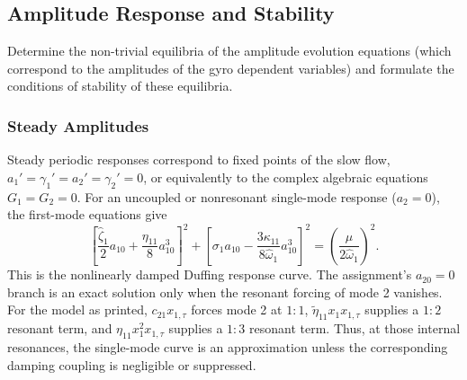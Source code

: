 \documentclass[11pt]{article}
\newenvironment{assignmentinstruction}{\par\begingroup\color{blue}}{\par\endgroup}
\begin{document}
\subsection{Amplitude Response and Stability}
\begin{assignmentinstruction}
Determine the non-trivial equilibria of the amplitude evolution equations (which correspond to the amplitudes of the gyro dependent variables) and formulate the conditions of stability of these equilibria.
\end{assignmentinstruction}
\subsubsection{Steady Amplitudes}
Steady periodic responses correspond to fixed points of the slow flow, $a_1'=\gamma_1'=a_2'=\gamma_2'=0$, or equivalently to the complex algebraic equations $G_1=G_2=0$. For an uncoupled or nonresonant single-mode response ($a_2=0$), the first-mode equations give
\begin{equation}\label{eq:single-mode-response}
\left[\frac{\hat\zeta_1}{2}a_{10}+\frac{\eta_{11}}{8}a_{10}^3\right]^2
+\left[\sigma_1a_{10}-\frac{3\kappa_{11}}{8\hat\omega_1}a_{10}^3\right]^2
=\left(\frac{\mu}{2\hat\omega_1}\right)^2.
\end{equation}
This is the nonlinearly damped Duffing response curve. The assignment's $a_{20}=0$ branch is an exact solution only when the resonant forcing of mode 2 vanishes. For the model as printed, $c_{21}x_{1,\tau}$ forces mode 2 at $1{:}1$, $\widetilde\eta_{11}x_1x_{1,\tau}$ supplies a $1{:}2$ resonant term, and $\eta_{11}x_1^2x_{1,\tau}$ supplies a $1{:}3$ resonant term. Thus, at those internal resonances, the single-mode curve is an approximation unless the corresponding damping coupling is negligible or suppressed.
\end{document}
